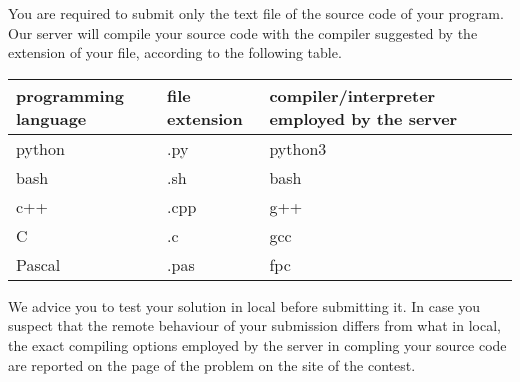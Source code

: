 You are required to submit only the text file of the source code of your program.
Our server will compile your source code with the compiler suggested by the extension of your file, according to the following table.

\vspace{0.2cm}
\begin{tabular}{|l|l|l|}
\hline
  programming language & file extension & compiler/interpreter employed by the server  \\ \hline
\hline               
  python  & .py  & python3 \\ \hline
  bash    & .sh  & bash \\ \hline
  c++     & .cpp & g++ \\ \hline
  C       & .c   & gcc \\ \hline
  Pascal  & .pas & fpc \\ \hline
\hline               
\end{tabular}
\vspace{0.2cm}

We advice you to test your solution in local before submitting it.
In case you suspect that the remote behaviour of your submission differs from what in local, the exact compiling options employed by the server in compling your source code are reported on the page of the problem on the site of the contest.
